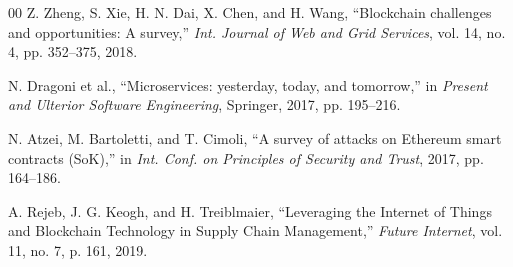 \documentclass[conference]{IEEEtran}
\begin{document}
\begin{thebibliography}{00}
 Z. Zheng, S. Xie, H. N. Dai, X. Chen, and H. Wang, ``Blockchain challenges and opportunities: A survey,'' \textit{Int. Journal of Web and Grid Services}, vol. 14, no. 4, pp. 352--375, 2018.

 N. Dragoni et al., ``Microservices: yesterday, today, and tomorrow,'' in \textit{Present and Ulterior Software Engineering}, Springer, 2017, pp. 195--216.

 N. Atzei, M. Bartoletti, and T. Cimoli, ``A survey of attacks on Ethereum smart contracts (SoK),'' in \textit{Int. Conf. on Principles of Security and Trust}, 2017, pp. 164--186.

 A. Rejeb, J. G. Keogh, and H. Treiblmaier, ``Leveraging the Internet of Things and Blockchain Technology in Supply Chain Management,'' \textit{Future Internet}, vol. 11, no. 7, p. 161, 2019.

\end{thebibliography}
\end{document}
